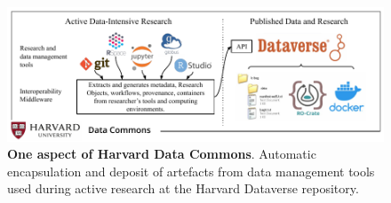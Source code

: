 \begin{figure}[t!]
    \centering
    \includegraphics{content/images/data-commons-ro-crate-figure-5.pdf}
    \caption{\textbf{One aspect of Harvard Data Commons}. Automatic encapsulation and deposit of artefacts from data management tools used during active research at the Harvard Dataverse repository.}
    \label{fig:hdc}
\end{figure}